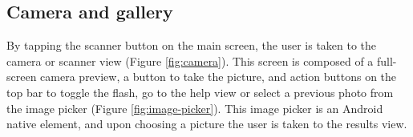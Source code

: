 \clearpage

\subsection{Camera and gallery}

By tapping the scanner button on the main screen, the user is taken to the camera or scanner view (Figure \ref{fig:camera}). This screen is composed of a full-screen camera preview, a button to take the picture, and action buttons on the top bar to toggle the flash, go to the help view or select a previous photo from the image picker (Figure \ref{fig:image-picker}). This image picker is an Android native element, and upon choosing a picture the user is taken to the results view.

\begin{figure}[h]
    \begin{subfigure}{0.5\textwidth}
        \centering

\end{subfigure}
\end{figure}
